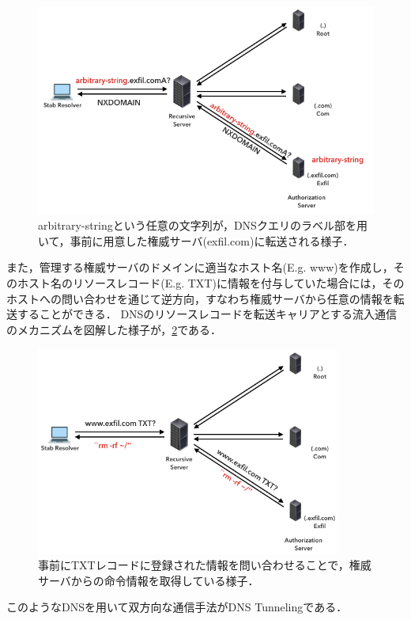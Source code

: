 \begin{figure}[h]
 \centering
 \includegraphics[width=12.0cm]{figure/dns-exfiltration.png}
 \caption{arbitrary-stringという任意の文字列が，DNSクエリのラベル部を用いて，事前に用意した権威サーバ(exfil.com)に転送される様子．}
 \label{fig:dns-exfiltration}
\end{figure}

また，管理する権威サーバのドメインに適当なホスト名(E.g. www)を作成し，そのホスト名のリソースレコード(E.g. TXT)に情報を付与していた場合には，そのホストへの問い合わせを通じて逆方向，すなわち権威サーバから任意の情報を転送することができる．
DNSのリソースレコードを転送キャリアとする流入通信のメカニズムを図解した様子が，\ref{fig:dns-tunneling}である．

\begin{figure}[h]
 \centering
 \includegraphics[width=10.0cm]{figure/dns-tunneling.png}
 \caption{事前にTXTレコードに登録された情報を問い合わせることで，権威サーバからの命令情報を取得している様子．}
 \label{fig:dns-tunneling}
\end{figure}

このようなDNSを用いて双方向な通信手法がDNS Tunnelingである．


